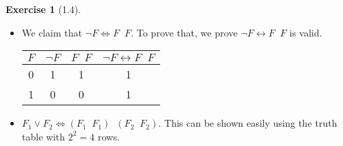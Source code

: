 \documentclass[12pt, psamsfonts]{amsart}
\theoremstyle{definition}
\newtheorem*{exer}{Exercise}
\theoremstyle{remark}
\DeclareMathOperator{\nand}{\overline{\land}}
\numberwithin{equation}{subsection}
\begin{document}
\begin{exer}[1.4]
    $ $
    \begin{itemize}
        \item
            We claim that $\neg F \Leftrightarrow F \nand F$.
            To prove that, we prove $\neg F \leftrightarrow F \nand F$ is valid.
            \begin{center}
                \begin{tabular}{ |c|c|c||c| }
                    \hline
                    $F$ & $\neg F$ & $F \nand F$ & $\neg F \leftrightarrow F \nand F$\\
                    \hline
                    0 & 1 & 1 & 1 \\
                    \hline
                    1 & 0 & 0 & 1 \\
                    \hline
                \end{tabular}
            \end{center}
        \item
            $F_1 \lor F_2 \Leftrightarrow (F_1 \nand F_1) \nand (F_2 \nand F_2)$.
            This can be shown easily using the truth table with $2^2 = 4$ rows.
    \end{itemize}
\end{exer}
\end{document}
